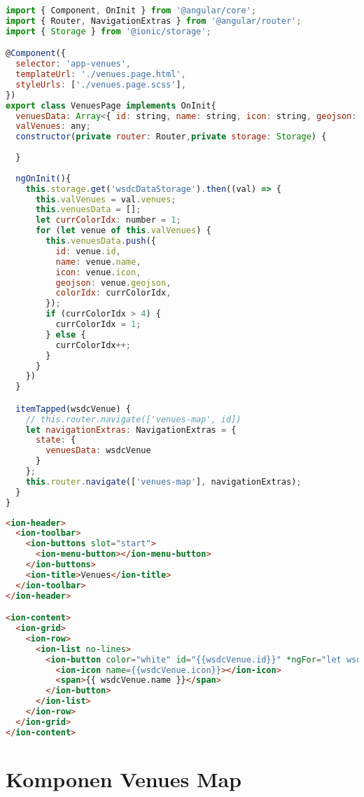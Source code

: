 \begin{lstlisting}[language=JavaScript, label={lst:venues.page.ts}, caption=venues.page.ts]
import { Component, OnInit } from '@angular/core';
import { Router, NavigationExtras } from '@angular/router';
import { Storage } from '@ionic/storage';

@Component({
  selector: 'app-venues',
  templateUrl: './venues.page.html',
  styleUrls: ['./venues.page.scss'],
})
export class VenuesPage implements OnInit{
  venuesData: Array<{ id: string, name: string, icon: string, geojson: any, colorIdx: number }>;
  valVenues: any;
  constructor(private router: Router,private storage: Storage) {
    
  }
  
  ngOnInit(){
    this.storage.get('wsdcDataStorage').then((val) => {
      this.valVenues = val.venues;
      this.venuesData = [];
      let currColorIdx: number = 1;
      for (let venue of this.valVenues) {
        this.venuesData.push({
          id: venue.id,
          name: venue.name,
          icon: venue.icon,
          geojson: venue.geojson,
          colorIdx: currColorIdx,
        });
        if (currColorIdx > 4) {
          currColorIdx = 1;
        } else {
          currColorIdx++;
        }
      }
    })
  }

  itemTapped(wsdcVenue) {
    // this.router.navigate(['venues-map', id])
    let navigationExtras: NavigationExtras = {
      state: {
        venuesData: wsdcVenue
      }
    };
    this.router.navigate(['venues-map'], navigationExtras);
  }
}

\end{lstlisting} 

\begin{lstlisting}[language=html, label={lst:venues.page.html}, caption=venues.page.html]
<ion-header>
  <ion-toolbar>
    <ion-buttons slot="start">
      <ion-menu-button></ion-menu-button>
    </ion-buttons>
    <ion-title>Venues</ion-title>
  </ion-toolbar>
</ion-header>

<ion-content>
  <ion-grid>
    <ion-row>
      <ion-list no-lines>
        <ion-button color="white" id="{{wsdcVenue.id}}" *ngFor="let wsdcVenue of venuesData" (click)="itemTapped(wsdcVenue)">
          <ion-icon name={{wsdcVenue.icon}}></ion-icon>
          <span>{{ wsdcVenue.name }}</span>
        </ion-button>
      </ion-list>
    </ion-row>
  </ion-grid>
</ion-content>

\end{lstlisting}

\section{Komponen Venues Map} 
\label{sec:lampiranKomponenVenuesMap}

